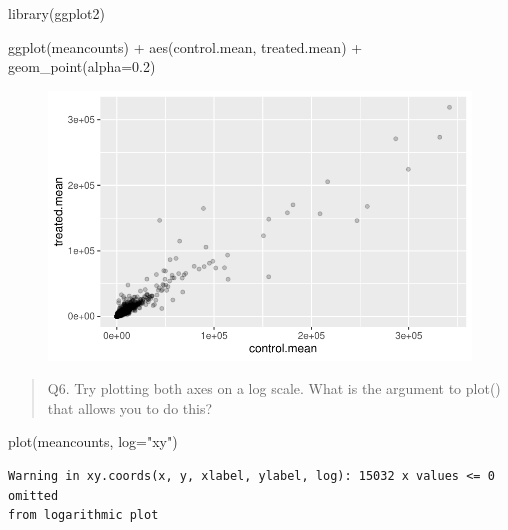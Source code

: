 \documentclass[
  letterpaper,
  DIV=11,
  numbers=noendperiod]{scrartcl}
\newenvironment{Shaded}{\begin{snugshade}}{\end{snugshade}}
\newcommand{\AttributeTok}[1]{\textcolor[rgb]{0.40,0.45,0.13}{#1}}
\newcommand{\FloatTok}[1]{\textcolor[rgb]{0.68,0.00,0.00}{#1}}
\newcommand{\FunctionTok}[1]{\textcolor[rgb]{0.28,0.35,0.67}{#1}}
\newcommand{\NormalTok}[1]{\textcolor[rgb]{0.00,0.23,0.31}{#1}}
\newcommand{\SpecialCharTok}[1]{\textcolor[rgb]{0.37,0.37,0.37}{#1}}
\newcommand{\StringTok}[1]{\textcolor[rgb]{0.13,0.47,0.30}{#1}}
\begin{document}
\begin{Shaded}
\begin{Highlighting}[]
\FunctionTok{library}\NormalTok{(ggplot2)}

\FunctionTok{ggplot}\NormalTok{(meancounts) }\SpecialCharTok{+} 
  \FunctionTok{aes}\NormalTok{(control.mean, treated.mean) }\SpecialCharTok{+} 
  \FunctionTok{geom\_point}\NormalTok{(}\AttributeTok{alpha=}\FloatTok{0.2}\NormalTok{)}
\end{Highlighting}
\end{Shaded}

\begin{figure}[H]

{\centering \includegraphics{Class13_files/figure-pdf/unnamed-chunk-14-1.pdf}

}

\end{figure}

\begin{quote}
Q6. Try plotting both axes on a log scale. What is the argument to
plot() that allows you to do this?
\end{quote}

\begin{Shaded}
\begin{Highlighting}[]
\FunctionTok{plot}\NormalTok{(meancounts, }\AttributeTok{log=}\StringTok{"xy"}\NormalTok{)}
\end{Highlighting}
\end{Shaded}

\begin{verbatim}
Warning in xy.coords(x, y, xlabel, ylabel, log): 15032 x values <= 0 omitted
from logarithmic plot
\end{verbatim}
\end{document}
